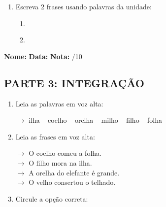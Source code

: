 \begin{exercicio}
\begin{enumerate}[resume]
  \item Escreva 2 frases usando palavras da unidade:
  \begin{enumerate}[label=\alph*)]
    \item \underline{\hspace{8cm}}
    \item \underline{\hspace{8cm}}
  \end{enumerate}

\end{enumerate}

\end{exercicio}



\begin{exercicio}

\noindent\textbf{Nome:} \underline{\hspace{3.2cm}} \quad \textbf{Data:} \underline{\hspace{1.6cm}} \quad \textbf{Nota:} \underline{\hspace{0.9cm}}/10


\subsection*{PARTE 3: INTEGRAÇÃO}

\begin{enumerate}[resume]

  \item Leia as palavras em voz alta:
  \begin{center}
  $\rightarrow$ ilha ~ coelho ~ orelha ~ milho ~ filho ~ folha
  \end{center}

  \item Leia as frases em voz alta:
  \begin{center}
  $\rightarrow$ O coelho comeu a folha.\\
  $\rightarrow$ O filho mora na ilha.\\
  $\rightarrow$ A orelha do elefante é grande.\\
  $\rightarrow$ O velho consertou o telhado.\\
  \end{center}

  \item Circule a opção correta:
  \begin{enumerate}[label=(\alph*)]


\end{enumerate}
\end{enumerate}
\end{exercicio}
